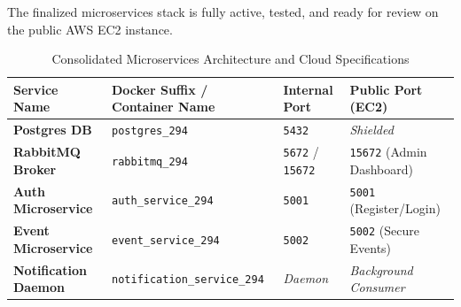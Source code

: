 \documentclass[11pt,a4paper]{article}
\begin{document}
The finalized microservices stack is fully active, tested, and ready for review on the public AWS EC2 instance.

\begin{table}[H]
  \centering
  \caption{Consolidated Microservices Architecture and Cloud Specifications}
  \begin{tabularx}{\linewidth}{l X l l}
    \toprule
    \textbf{Service Name} & \textbf{Docker Suffix / Container Name} & \textbf{Internal Port} & \textbf{Public Port (EC2)} \\
    \midrule
    \textbf{Postgres DB} & \texttt{postgres\_294} & \texttt{5432} & \textit{Shielded} \\
    \textbf{RabbitMQ Broker} & \texttt{rabbitmq\_294} & \texttt{5672} / \texttt{15672} & \texttt{15672} (Admin Dashboard) \\
    \textbf{Auth Microservice} & \texttt{auth\_service\_294} & \texttt{5001} & \texttt{5001} (Register/Login) \\
    \textbf{Event Microservice} & \texttt{event\_service\_294} & \texttt{5002} & \texttt{5002} (Secure Events) \\
    \textbf{Notification Daemon} & \texttt{notification\_service\_294} & \textit{Daemon} & \textit{Background Consumer} \\
    \bottomrule
  \end{tabularx}
  \label{tab:specs}
\end{table}
\end{document}
